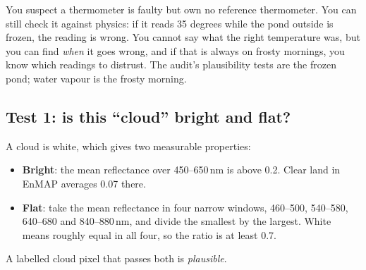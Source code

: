 \begin{analogy}
You suspect a thermometer is faulty but own no reference thermometer. You can still check it against physics: if it reads 35 degrees while the
pond outside is frozen, the reading is wrong. You cannot say what the right temperature was, but you can find \emph{when} it goes wrong, and if
that is always on frosty mornings, you know which readings to distrust. The audit's plausibility tests are the frozen pond; water vapour is the
frosty morning.
\end{analogy}

\subsection{Test 1: is this ``cloud'' bright and flat?}

A cloud is white, which gives two measurable properties:
\begin{itemize}
  \item \textbf{Bright}: the mean reflectance over 450--650\,nm is above 0.2. Clear land in EnMAP averages 0.07 there.
  \item \textbf{Flat}: take the mean reflectance in four narrow windows, 460--500, 540--580, 640--680 and 840--880\,nm, and divide the smallest by
    the largest. White means roughly equal in all four, so the ratio is at least 0.7.
\end{itemize}
A labelled cloud pixel that passes both is \emph{plausible}.

